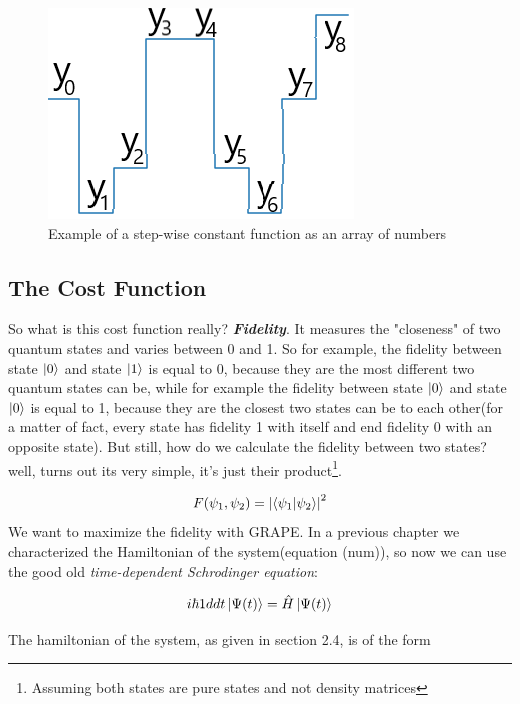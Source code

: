 \documentclass[english, a4paper, 12pt, twoside]{article}
\numberwithin{equation}{section} %
\begin{document}
\begin{figure}[H]
    \centering
    \includegraphics[width=0.3\columnwidth]{step-wise_example.png} %
    \caption{Example of a step-wise constant function as an array of numbers}
    \label{fig:step-wise-const}
\end{figure}

\subsection{The Cost Function}
So what is this cost function really? \textit{\textbf{Fidelity}}. It measures the "closeness" of two quantum states and varies between 0 and 1. So for example, the fidelity between state $\ket{0}$ and state $\ket{1}$ is equal to 0, because they are the most different two quantum states can be, while for example the fidelity between state $\ket{0}$ and state $\ket{0}$ is equal to 1, because they are the closest two states can be to each other(for a matter of fact, every state has fidelity 1 with itself and end fidelity 0 with an opposite state). But still, how do we calculate the fidelity between two states? well, turns out its very simple, it's just their product\footnote{Assuming both states are pure states and not density matrices}.

\begin{equation} \label{def:fid}
F(\psi_1, \psi_2) = \abs{\braket{\psi_1}{\psi_2}}^2
\end{equation}
We want to maximize the fidelity with GRAPE.
In a previous chapter we characterized the Hamiltonian of the system(equation (num)), so now we can use the good old \textit{time-dependent Schrodinger equation}:

\begin{equation}
i\hbar1{d}{dt}\ket{\Psi(t)} = \hat{H}\ket{\Psi(t)}
\end{equation}

The hamiltonian of the system, as given in section 2.4, is of the  form %
\end{document}
